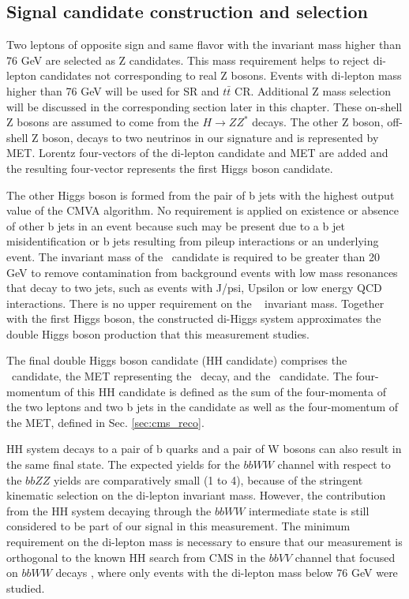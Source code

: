 \begin{small}
\subsection{Signal candidate construction and selection}

Two leptons of opposite sign and same flavor with the invariant mass higher than 76 GeV are selected as Z candidates. This mass requirement helps to reject di-lepton candidates not corresponding to real Z bosons. Events with di-lepton mass higher than 76 GeV will be used for SR and $t\bar{t}$ CR. Additional Z mass selection will be discussed in the corresponding section later in this chapter. These on-shell Z bosons are assumed to come from the $H \to Z Z^*$ decays. The other Z boson, off-shell Z boson, decays to two neutrinos in our signature and is represented by MET. Lorentz four-vectors of the di-lepton candidate and MET are added and the resulting four-vector represents the first Higgs boson candidate. 

The other Higgs boson is formed from the pair of b jets with the highest output value of the CMVA algorithm. No requirement is applied on existence or absence of other b jets in an event because such may be present due to a b jet misidentification or b jets resulting from pileup interactions or an underlying event. The invariant mass of the \HBB~candidate is required to be greater than 20 GeV to remove contamination from background events with low mass resonances that decay to two jets, such as events with J/psi, Upsilon or low energy QCD interactions. There is no upper requirement on the \HBB~ invariant mass. Together with the first Higgs boson, the constructed di-Higgs system approximates the double Higgs boson production that this measurement studies. 

The final double Higgs boson candidate (HH candidate) comprises the \Zll~candidate, the MET representing the \Znn~decay, and the \HBB~candidate. The four-momentum of this HH candidate is defined as the sum of the four-momenta of the two leptons and two b jets in the candidate as well as the four-momentum of the MET, defined in Sec. \ref{sec:cms_reco}.

HH system decays to a pair of b quarks and a pair of W bosons can also result in the same final state. The expected yields for the $bbWW$ channel with respect to the $bbZZ$ yields are comparatively small (1 to 4), because of the stringent kinematic selection on the di-lepton invariant mass. However, the contribution from the HH system decaying through the $bbWW$ intermediate state is still considered to be part of our signal in this measurement. The minimum requirement on the di-lepton mass is necessary to ensure that our measurement is orthogonal to the known HH search from CMS in the $bbVV$ channel that focused on $bbWW$ decays \cite{bbWW}, where only events with the di-lepton mass below 76 GeV were studied.


\end{small}
